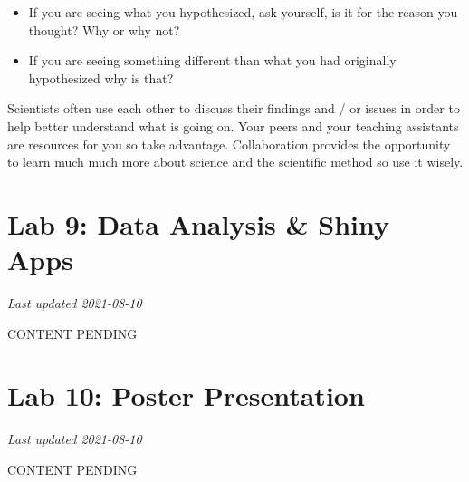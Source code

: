 \documentclass[
]{book}
\providecommand{\tightlist}{%
  \setlength{\itemsep}{0pt}\setlength{\parskip}{0pt}}
\begin{document}
\begin{itemize}
\tightlist
\item
  If you are seeing what you hypothesized, ask yourself, is it for the reason you thought? Why or why not?
\item
  If you are seeing something different than what you had originally hypothesized why is that?
\end{itemize}

Scientists often use each other to discuss their findings and / or issues in order to help better understand what is going on. Your peers and your teaching assistants are resources for you so take advantage. Collaboration provides the opportunity to learn much much more about science and the scientific method so use it wisely.

\hypertarget{lab-9-data-analysis-shiny-apps}{%
\chapter*{Lab 9: Data Analysis \& Shiny Apps}\label{lab-9-data-analysis-shiny-apps}}

\emph{Last updated 2021-08-10}

CONTENT PENDING

\hypertarget{lab-10-poster-presentation}{%
\chapter*{Lab 10: Poster Presentation}\label{lab-10-poster-presentation}}

\emph{Last updated 2021-08-10}

CONTENT PENDING
\end{document}
